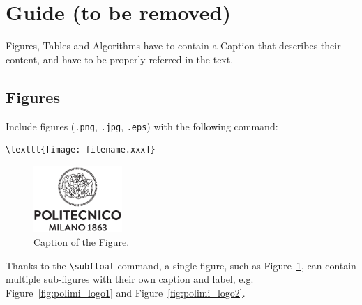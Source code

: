 \documentclass[11pt,a4paper]{article}
\begin{document}
\section{Guide (to be removed)}

Figures, Tables and Algorithms have to contain a Caption that describes their content, and have to be properly referred in the text.

\subsection{Figures}
\label{subsec:figures}

Include figures (\verb|.png|, \verb|.jpg|, \verb|.eps|) with the following command:
\begin{verbatim}
\texttt{[image: filename.xxx]}
\end{verbatim}

\begin{figure}[H]
    \centering
    \includegraphics[width=0.3\textwidth]{logo_polimi_scritta.eps}
    \caption{Caption of the Figure.}
    \label{fig:quadtree}
\end{figure}

Thanks to the \texttt{\textbackslash subfloat} command, a single figure, such as Figure~\ref{fig:quadtree},
can contain multiple sub-figures with their own caption and label, e.g. Figure~\ref{fig:polimi_logo1} and Figure~\ref{fig:polimi_logo2}. 
\end{document}
